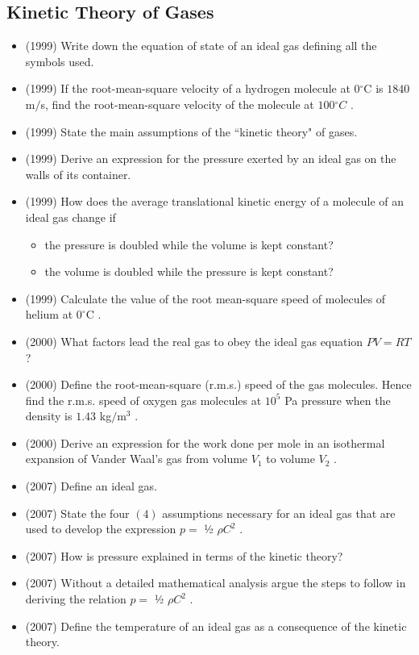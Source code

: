 \documentclass{article}
\begin{document}
\subsection{Kinetic Theory of Gases}
\begin{itemize}
\item (1999)  Write down the equation of state of an ideal gas defining all the symbols used.
\item (1999)  If the root-mean-square velocity of a hydrogen molecule at $ 0​ ^{\circ}$C is $ 1840$ m$/$s, find the root-mean-square velocity of the molecule at $ 100​ ^{\circ}$ ​ $ C$ .
\item (1999)  State the main assumptions of the “kinetic theory" of gases.
\item (1999)  Derive an expression for the pressure exerted by an ideal gas on the walls of its container.
\item (1999)  How does the average translational kinetic energy of a molecule of an ideal gas change if
 \begin{itemize}
\item the pressure is doubled while the volume is kept constant?
\item the volume is doubled while the pressure is kept constant?
\end{itemize}
\item (1999)  Calculate the value of the root mean-square speed of molecules of helium at $ 0^{\circ}$C .
\item (2000)  What factors lead the real gas to obey the ideal gas equation $ PV = RT$ ?
\item (2000)  Define the root-mean-square (r.m.s.) speed of the gas molecules. Hence find the r.m.s. speed of oxygen gas molecules at $ 10^{5}$ Pa pressure when the density is $ 1.43$ kg$/$m$ ^{3}$ .
\item (2000)  Derive an expression for the work done per mole in an isothermal expansion of Vander Waal’s gas from volume $ V_{1}$ to volume $ V_{2}$ .
\item (2007)  Define an ideal gas.
\item (2007)  State the four $ (4)$ assumptions necessary for an ideal gas that are used to develop the expression $ p=$ ½ $ \rho C^{2}$ .
\item (2007)  How is pressure explained in terms of the kinetic theory? 
\item (2007)  Without a detailed mathematical analysis argue the steps to follow in deriving the relation $ p=$ ½ $ \rho C^{2}$ .
\item (2007)  Define the temperature of an ideal gas as a consequence of the kinetic theory.

\end{itemize}
\end{document}
